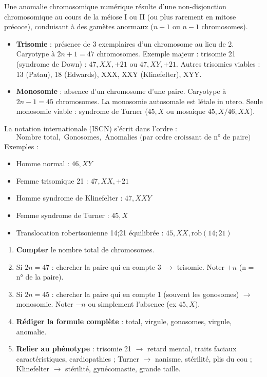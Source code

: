 \documentclass[11pt]{article}
\newcommand{\cle}[1]{{\popxbold\color{popdark}#1}}
\begin{document}
\begin{definition}
Une \cle{anomalie chromosomique numérique} résulte d'une \cle{non-disjonction} chromosomique au cours de la méiose I ou II (ou plus rarement en mitose précoce), conduisant à des gamètes anormaux ($n+1$ ou $n-1$ chromosomes).
\begin{itemize}
\item \textbf{Trisomie} : présence de 3 exemplaires d'un chromosome au lieu de 2. Caryotype à $2n+1 = 47$ chromosomes. Exemple majeur : \cle{trisomie 21} (syndrome de Down) : $47, XX, +21$ ou $47, XY, +21$. Autres trisomies viables : 13 (Patau), 18 (Edwards), XXX, XXY (Klinefelter), XYY.
\item \textbf{Monosomie} : absence d'un chromosome d'une paire. Caryotype à $2n-1 = 45$ chromosomes. La monosomie autosomale est létale in utero. Seule monosomie viable : \cle{syndrome de Turner} ($45, X$ ou mosaique $45, X / 46, XX$).
\end{itemize}
\end{definition}

\begin{propriete}
La notation internationale (ISCN) s'écrit dans l'ordre :
\[ \text{Nombre total}, \text{ Gonosomes}, \text{ Anomalies (par ordre croissant de n° de paire)} \]
Exemples :
\begin{itemize}
\item Homme normal : $46, XY$
\item Femme trisomique 21 : $47, XX, +21$
\item Homme syndrome de Klinefelter : $47, XXY$
\item Femme syndrome de Turner : $45, X$
\item Translocation robertsonienne 14;21 équilibrée : $45, XX, \text{rob}(14;21)$
\end{itemize}
\end{propriete}

\begin{methode}
\begin{enumerate}
\item \textbf{Compter} le nombre total de chromosomes.
\item Si $2n = 47$ : chercher la paire qui en compte 3 $\rightarrow$ \cle{trisomie}. Noter $+n$ (n = n° de la paire).
\item Si $2n = 45$ : chercher la paire qui en compte 1 (souvent les gonosomes) $\rightarrow$ \cle{monosomie}. Noter $-n$ ou simplement l'absence (ex $45, X$).
\item \textbf{Rédiger la formule complète} : total, virgule, gonosomes, virgule, anomalie.
\item \textbf{Relier au phénotype} : trisomie 21 $\rightarrow$ retard mental, traits faciaux caractéristiques, cardiopathies ; Turner $\rightarrow$ nanisme, stérilité, plis du cou ; Klinefelter $\rightarrow$ stérilité, gynécomastie, grande taille.
\end{enumerate}
\end{methode}
\end{document}
